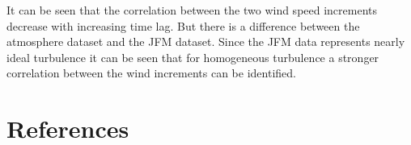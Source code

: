 \documentclass[12pt]{article}
\begin{document}
It can be seen that the correlation between the two wind speed increments decrease with increasing time lag. But there is a difference between the atmosphere dataset and the JFM dataset. Since the JFM data represents nearly ideal turbulence it can be seen that for homogeneous turbulence a stronger correlation between the wind increments can be identified.
\newpage
\section{References}


\end{document}
